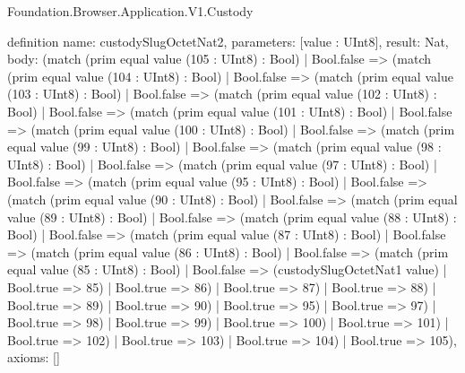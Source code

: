 \begin{lexlean}{Foundation.Browser.Application.V1.Custody}
\begin{semanticmodule}
definition{
  name: custodySlugOctetNat2,
  parameters: [value : UInt8],
  result: Nat,
  body: (match (prim equal value (105 : UInt8) : Bool)
    | Bool.false => (match (prim equal value (104 : UInt8) : Bool)
      | Bool.false => (match (prim equal value (103 : UInt8) : Bool)
        | Bool.false => (match (prim equal value (102 : UInt8) : Bool)
          | Bool.false => (match (prim equal value (101 : UInt8) : Bool)
            | Bool.false => (match (prim equal value (100 : UInt8) : Bool)
              | Bool.false => (match (prim equal value (99 : UInt8) : Bool)
                | Bool.false => (match (prim equal value (98 : UInt8) : Bool)
                  | Bool.false => (match (prim equal value (97 : UInt8) : Bool)
                    | Bool.false => (match (prim equal value (95 : UInt8) : Bool)
                      | Bool.false => (match (prim equal value (90 : UInt8) : Bool)
                        | Bool.false => (match (prim equal value (89 : UInt8) : Bool)
                          | Bool.false => (match (prim equal value (88 : UInt8) : Bool)
                            | Bool.false => (match (prim equal value (87 : UInt8) : Bool)
                              | Bool.false => (match (prim equal value (86 : UInt8) : Bool)
                                | Bool.false => (match (prim equal value (85 : UInt8) : Bool)
                                  | Bool.false => (custodySlugOctetNat1 value)
                                  | Bool.true => 85)
                                | Bool.true => 86)
                              | Bool.true => 87)
                            | Bool.true => 88)
                          | Bool.true => 89)
                        | Bool.true => 90)
                      | Bool.true => 95)
                    | Bool.true => 97)
                  | Bool.true => 98)
                | Bool.true => 99)
              | Bool.true => 100)
            | Bool.true => 101)
          | Bool.true => 102)
        | Bool.true => 103)
      | Bool.true => 104)
    | Bool.true => 105),
  axioms: []
}


\end{semanticmodule}
\end{lexlean}
